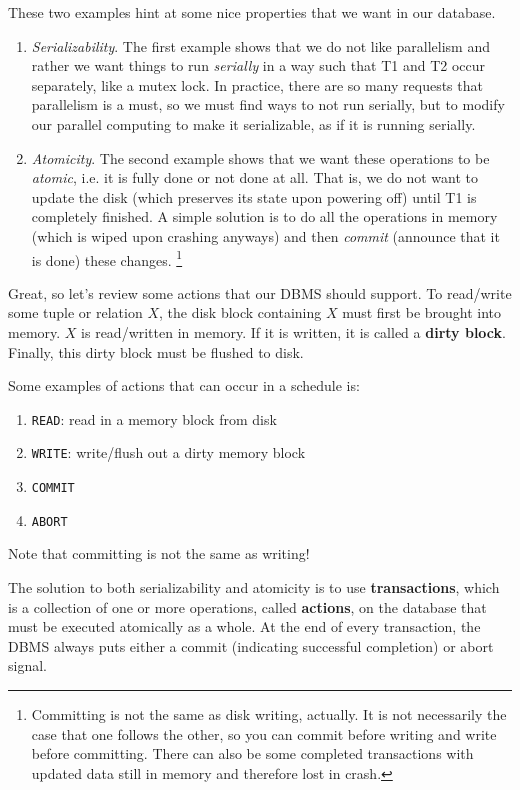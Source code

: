   These two examples hint at some nice properties that we want in our database. 
  \begin{enumerate}
    \item \textit{Serializability}. The first example shows that we do not like parallelism and rather we want things to run \textit{serially} in a way such that T1 and T2 occur separately, like a mutex lock. In practice, there are so many requests that parallelism is a must, so we must find ways to not run serially, but to modify our parallel computing to make it serializable, as if it is running serially.  
    \item \textit{Atomicity}. The second example shows that we want these operations to be \textit{atomic}, i.e. it is fully done or not done at all. That is, we do not want to update the disk (which preserves its state upon powering off) until  T1 is completely finished. A simple solution is to do all the operations in memory (which is wiped upon crashing anyways) and then \textit{commit} (announce that it is done) these changes. \footnote{Committing is not the same as disk writing, actually. It is not necessarily the case that one follows the other, so you can commit before writing and write before committing. There can also be some completed transactions with updated data still in memory and therefore lost in crash.} 
  \end{enumerate} 

  Great, so let's review some actions that our DBMS should support. To read/write some tuple or relation $X$, the disk block containing $X$ must first be brought into memory. $X$ is read/written in memory. If it is written, it is called a \textbf{dirty block}. Finally, this dirty block must be flushed to disk. 

  \begin{definition}[Actions]
    \label{def:actions}
    Some examples of actions that can occur in a schedule is: 
    \begin{enumerate}
      \item \texttt{READ}: read in a memory block from disk
      \item \texttt{WRITE}: write/flush out a dirty memory block 
      \item \texttt{COMMIT}
      \item \texttt{ABORT} 
    \end{enumerate}
    Note that committing is not the same as writing! 
  \end{definition}

  \begin{definition}[Transaction]
    \label{def:transaction}
    The solution to both serializability and atomicity is to use \textbf{transactions}, which is a collection of one or more operations, called \textbf{actions}, on the database that must be executed atomically as a whole. At the end of every transaction, the DBMS always puts either a commit (indicating successful completion) or abort signal. 
  \end{definition} 

